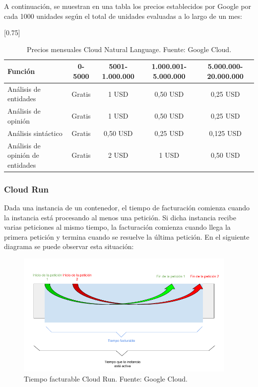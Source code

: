A continuación, se muestran en una tabla los precios establecidos por Google por cada 1000 unidades según el total de unidades evaluadas a lo largo de un mes:

\begin{table} [htbp]
	\centering
    \scalebox{0.75}[0.75] {
	\begin{tabular}{l c c c c}
		\textbf{Función} & \textbf{0-5000} & \textbf{5001-1.000.000} & \textbf{1.000.001-5.000.000} & \textbf{5.000.000-20.000.000} \\ \hline
         Análisis de entidades & Gratis & 1 USD & 0,50 USD & 0,25 USD \\
         Análisis de opinión & Gratis & 1 USD & 0,50 USD & 0,25 USD \\
         Análisis sintáctico & Gratis & 0,50 USD & 0,25 USD & 0,125 USD \\
         Análisis de opinión de entidades & Gratis & 2 USD & 1 USD & 0,50 USD \\
	\end{tabular}}
	\centering
	\caption{\label{tab:costeNLP}Precios mensuales Cloud Natural Language. Fuente: Google Cloud.}
\end{table}

\newpage

\subsubsection{Cloud Run}

Dada una instancia de un contenedor, el tiempo de facturación comienza cuando la instancia está procesando al menos una petición. Si dicha instancia recibe varias peticiones al mismo tiempo, la facturación comienza cuando llega la primera petición y termina cuando se resuelve la última petición. En el siguiente diagrama se puede observar esta situación:

\begin{figure}[ht]
	\begin{center}
		\includegraphics[width = 0.95\textwidth]{Figuras/FacturacionCloudRun.png}
	\end{center}
	\caption{\label{fig:facturacionCloudRun} Tiempo facturable Cloud Run. Fuente: Google Cloud.}
\end{figure}


